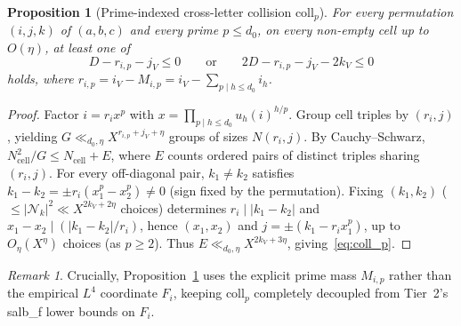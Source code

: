 \documentclass[11pt,a4paper]{amsart}
\theoremstyle{plain}
\newtheorem{proposition}[theorem]{Proposition}
\theoremstyle{definition}
\theoremstyle{remark}
\newtheorem{remark}[theorem]{Remark}
\begin{document}
\begin{proposition}[Prime-indexed cross-letter collision \textsf{coll}$_p$]\label{prop:coll_p}
For every permutation $(i,j,k)$ of $(a,b,c)$ and every prime $p \le d_0$, on every non-empty cell up to $O(\eta)$, at least one of
\begin{equation}\label{eq:coll_p}
  D - r_{i,p} - j_V \le 0 \qquad\text{or}\qquad 2 D - r_{i,p} - j_V - 2 k_V \le 0
\end{equation}
holds, where $r_{i,p} = i_V - M_{i,p} = i_V - \sum_{p \mid h \le d_0} i_h$.
\end{proposition}
\begin{proof}
Factor $i = r_i x^p$ with $x = \prod_{p \mid h \le d_0} u_h(i)^{h/p}$. Group cell triples by $(r_i, j)$, yielding $G \ll_{d_0,\eta} X^{r_{i,p} + j_V + \eta}$ groups of sizes $N(r_i,j)$. By Cauchy--Schwarz, $N_{\mathrm{cell}}^2 / G \le N_{\mathrm{cell}} + E$, where $E$ counts ordered pairs of distinct triples sharing $(r_i, j)$. For every off-diagonal pair, $k_1 \neq k_2$ satisfies $k_1 - k_2 = \pm r_i(x_1^p - x_2^p) \neq 0$ (sign fixed by the permutation). Fixing $(k_1, k_2)$ ($\le |\mathcal{N}_k|^2 \ll X^{2 k_V + 2\eta}$ choices) determines $r_i \mid |k_1-k_2|$ and $x_1 - x_2 \mid (|k_1-k_2|/r_i)$, hence $(x_1, x_2)$ and $j = \pm(k_1 - r_i x_1^p)$, up to $O_\eta(X^\eta)$ choices (as $p \ge 2$). Thus $E \ll_{d_0,\eta} X^{2 k_V + 3\eta}$, giving~\eqref{eq:coll_p}.
\end{proof}

\begin{remark}
Crucially, Proposition~\ref{prop:coll_p} uses the explicit prime mass $M_{i,p}$ rather than the empirical $L^4$ coordinate $F_i$, keeping \textsf{coll}$_p$ completely decoupled from Tier~2's \textsf{salb\_f} lower bounds on $F_i$.
\end{remark}
\end{document}
